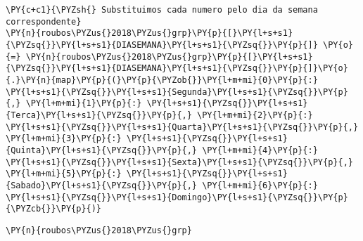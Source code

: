     \begin{tcolorbox}[breakable, size=fbox, boxrule=1pt, pad at break*=1mm,colback=cellbackground, colframe=cellborder]
\begin{Verbatim}[commandchars=\\\{\}]
\PY{c+c1}{\PYZsh{} Substituimos cada numero pelo dia da semana correspondente}
\PY{n}{roubos\PYZus{}2018\PYZus{}grp}\PY{p}{[}\PY{l+s+s1}{\PYZsq{}}\PY{l+s+s1}{DIASEMANA}\PY{l+s+s1}{\PYZsq{}}\PY{p}{]} \PY{o}{=} \PY{n}{roubos\PYZus{}2018\PYZus{}grp}\PY{p}{[}\PY{l+s+s1}{\PYZsq{}}\PY{l+s+s1}{DIASEMANA}\PY{l+s+s1}{\PYZsq{}}\PY{p}{]}\PY{o}{.}\PY{n}{map}\PY{p}{(}\PY{p}{\PYZob{}}\PY{l+m+mi}{0}\PY{p}{:} \PY{l+s+s1}{\PYZsq{}}\PY{l+s+s1}{Segunda}\PY{l+s+s1}{\PYZsq{}}\PY{p}{,} \PY{l+m+mi}{1}\PY{p}{:} \PY{l+s+s1}{\PYZsq{}}\PY{l+s+s1}{Terca}\PY{l+s+s1}{\PYZsq{}}\PY{p}{,} \PY{l+m+mi}{2}\PY{p}{:} \PY{l+s+s1}{\PYZsq{}}\PY{l+s+s1}{Quarta}\PY{l+s+s1}{\PYZsq{}}\PY{p}{,} \PY{l+m+mi}{3}\PY{p}{:} \PY{l+s+s1}{\PYZsq{}}\PY{l+s+s1}{Quinta}\PY{l+s+s1}{\PYZsq{}}\PY{p}{,} \PY{l+m+mi}{4}\PY{p}{:} \PY{l+s+s1}{\PYZsq{}}\PY{l+s+s1}{Sexta}\PY{l+s+s1}{\PYZsq{}}\PY{p}{,} \PY{l+m+mi}{5}\PY{p}{:} \PY{l+s+s1}{\PYZsq{}}\PY{l+s+s1}{Sabado}\PY{l+s+s1}{\PYZsq{}}\PY{p}{,} \PY{l+m+mi}{6}\PY{p}{:} \PY{l+s+s1}{\PYZsq{}}\PY{l+s+s1}{Domingo}\PY{l+s+s1}{\PYZsq{}}\PY{p}{\PYZcb{}}\PY{p}{)}
\end{Verbatim}
\end{tcolorbox}

    \begin{tcolorbox}[breakable, size=fbox, boxrule=1pt, pad at break*=1mm,colback=cellbackground, colframe=cellborder]
\begin{Verbatim}[commandchars=\\\{\}]
\PY{n}{roubos\PYZus{}2018\PYZus{}grp}
\end{Verbatim}
\end{tcolorbox}

